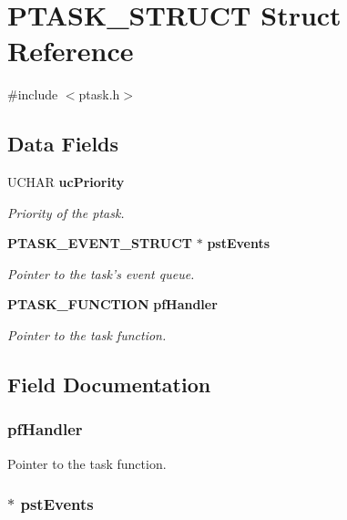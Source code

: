 \section{PTASK\_\-STRUCT Struct Reference}
\label{struct_p_t_a_s_k___s_t_r_u_c_t}


{\ttfamily \#include $<$ptask.h$>$}\subsection*{Data Fields}
\begin{DoxyCompactItemize}
\item 
UCHAR {\bf ucPriority}
\begin{DoxyCompactList}\small\item\em Priority of the ptask. \item\end{DoxyCompactList}\item 
{\bf PTASK\_\-EVENT\_\-STRUCT} $\ast$ {\bf pstEvents}
\begin{DoxyCompactList}\small\item\em Pointer to the task's event queue. \item\end{DoxyCompactList}\item 
{\bf PTASK\_\-FUNCTION} {\bf pfHandler}
\begin{DoxyCompactList}\small\item\em Pointer to the task function. \item\end{DoxyCompactList}\end{DoxyCompactItemize}


\subsection{Field Documentation}
\subsubsection[{pfHandler}]{ {\bf pfHandler}}\label{struct_p_t_a_s_k___s_t_r_u_c_t_a8aed1a7fad295636cbfb857f9a1b8a08}


Pointer to the task function. 
\subsubsection[{pstEvents}]{$\ast$ {\bf pstEvents}}\label{struct_p_t_a_s_k___s_t_r_u_c_t_ad729a20d8cb7c388fdd1fa6072f66e0a}


